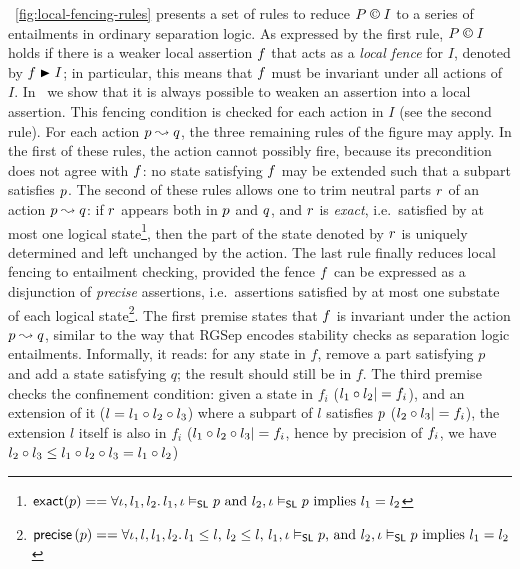 \fig~\ref{fig:local-fencing-rules} presents a set of
rules to reduce $P \containI I$ to a series of entailments in
ordinary separation logic. As expressed by the first rule,
$P \containI I$ holds if there is a weaker local assertion $\lass{F}$
that acts as a \emph{local fence} for $I$, denoted by
$\lass{F}\strictfences I$; in particular, this means that $\lass{F}$
must be invariant under all actions of $I$. In~\cite{colosl-tr14}
we show that it is always possible to weaken an assertion into a local assertion. This fencing condition is
checked for each action in $I$ (see the second rule). For each action
$\lass{P}\swap \lass{Q}$, the three remaining rules of the figure may
apply. In the first of these rules, the action cannot possibly fire,
because its precondition does not agree with $\lass{F}$: no state
satisfying $\lass{F}$ may be extended such that a subpart satisfies
$\lass{P}$. 
The second of these rules allows one to trim neutral parts
$\lass{R}$ of an action $\lass{P}\swap \lass{Q}$: if $\lass{R}$
appears both in $\lass{P}$ and $\lass{Q}$, and $\lass{R}$ is \emph{exact}, i.e.\ satisfied by at most
one logical state\footnote{$\textsf{exact}(p) ==
    \forall \iota, l_1, l_2.\, l_1, \iota \mathrel{\vDash_{\mathsf{SL}}} p\text{ and }l_2, \iota
    \mathrel{\vDash_{\mathsf{SL}}} p\text{ implies } l_1 = l_2$},
then the part of the state denoted by $\lass{R}$ is uniquely
determined and left unchanged by the action. 
The last rule finally reduces local fencing to entailment checking, provided the fence
$\lass{F}$ can be expressed as a disjunction of \emph{precise}
assertions, i.e.\ assertions satisfied by at most one substate of each
logical state\footnote{$\textsf{precise} \left( p \right) ==
    \forall \iota, l, l_1, l_2.\, l_1\leq l\text{, }l_2\leq l\text{, }l_1,
    \iota \mathrel{\vDash_{\mathsf{SL}}} p\text{, and }l_2, \iota \mathrel{\vDash_{\mathsf{SL}}} p
    \text{ implies } l_1 = l_2$}. The
first premise states that $\lass{F}$ is invariant under the action
$\lass{P}\swap \lass{Q}$, similar to the way that RGSep encodes
stability checks as separation logic entailments. Informally, it
reads: for any state in $f$, remove a part satisfying $p$ and add a
state satisfying $q$; the result should still be in $f$. The third
premise checks the confinement condition: given a state in $f_i$ ($l_1\composeL l_2|= \lass{F}_i$), and an extension of it ($l = l_1 \circ l_2 \circ l_3$) where a subpart of $l$ satisfies $\lass{P}$ ($l_2 \circ l_3 |= f_i$), the extension $l$ itself is also in $f_i$ ($l_1\composeL l_2\composeL
l_3|=\lass{F}_i$, hence by precision of $\lass{F}_i$, we have $l_2\circ
l_3\leq l_1\circ l_2\circ l_3 = l_1\circ l_2$)

